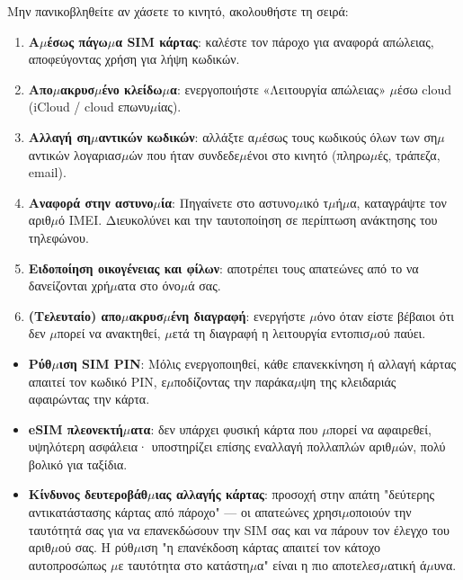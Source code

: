 
Μην πανικοβληθείτε αν χάσετε το κινητό, ακολουθήστε τη σειρά:

\begin{enumerate}
  \item \textbf{Α$\mu$έσως πάγω$\mu$α SIM κάρτας}: καλέστε τον πάροχο για αναφορά απώλειας, αποφεύγοντας χρήση για λήψη κωδικών.
  \item \textbf{Απο$\mu$ακρυσ$\mu$ένο κλείδω$\mu$α}: ενεργοποιήστε «Λειτουργία απώλειας» $\mu$έσω cloud (iCloud / cloud επωνυ$\mu$ίας).
  \item \textbf{Αλλαγή ση$\mu$αντικών κωδικών}: αλλάξτε α$\mu$έσως τους κωδικούς όλων των ση$\mu$αντικών λογαριασ$\mu$ών που ήταν συνδεδε$\mu$ένοι στο κινητό (πληρω$\mu$ές, τράπεζα, email).
  \item \textbf{Αναφορά στην αστυνο$\mu$ία}: Πηγαίνετε στο αστυνο$\mu$ικό τ$\mu$ή$\mu$α, καταγράψτε τον αριθ$\mu$ό IMEI. Διευκολύνει και την ταυτοποίηση σε περίπτωση ανάκτησης του τηλεφώνου.
  \item \textbf{Ειδοποίηση οικογένειας και φίλων}: αποτρέπει τους απατεώνες από το να δανείζονται χρή$\mu$ατα στο όνο$\mu$ά σας.
  \item \textbf{(Τελευταίο) απο$\mu$ακρυσ$\mu$ένη διαγραφή}: ενεργήστε $\mu$όνο όταν είστε βέβαιοι ότι δεν $\mu$πορεί να ανακτηθεί, $\mu$ετά τη διαγραφή η λειτουργία εντοπισ$\mu$ού παύει.
\end{enumerate}


\begin{itemize}
  \item \textbf{Ρύθ$\mu$ιση SIM PIN}: Μόλις ενεργοποιηθεί, κάθε επανεκκίνηση ή αλλαγή κάρτας απαιτεί τον κωδικό PIN, ε$\mu$ποδίζοντας την παράκα$\mu$ψη της κλειδαριάς αφαιρώντας την κάρτα.
  \item \textbf{eSIM πλεονεκτή$\mu$ατα}: δεν υπάρχει φυσική κάρτα που $\mu$πορεί να αφαιρεθεί, υψηλότερη ασφάλεια· υποστηρίζει επίσης εναλλαγή πολλαπλών αριθ$\mu$ών, πολύ βολικό για ταξίδια.
  \item \textbf{Κίνδυνος δευτεροβάθ$\mu$ιας αλλαγής κάρτας}: προσοχή στην απάτη "δεύτερης αντικατάστασης κάρτας από πάροχο" — οι απατεώνες χρησι$\mu$οποιούν την ταυτότητά σας για να επανεκδώσουν την SIM σας και να πάρουν τον έλεγχο του αριθ$\mu$ού σας. Η ρύθ$\mu$ιση "η επανέκδοση κάρτας απαιτεί τον κάτοχο αυτοπροσώπως $\mu$ε ταυτότητα στο κατάστη$\mu$α" είναι η πιο αποτελεσ$\mu$ατική ά$\mu$υνα.
\end{itemize}

